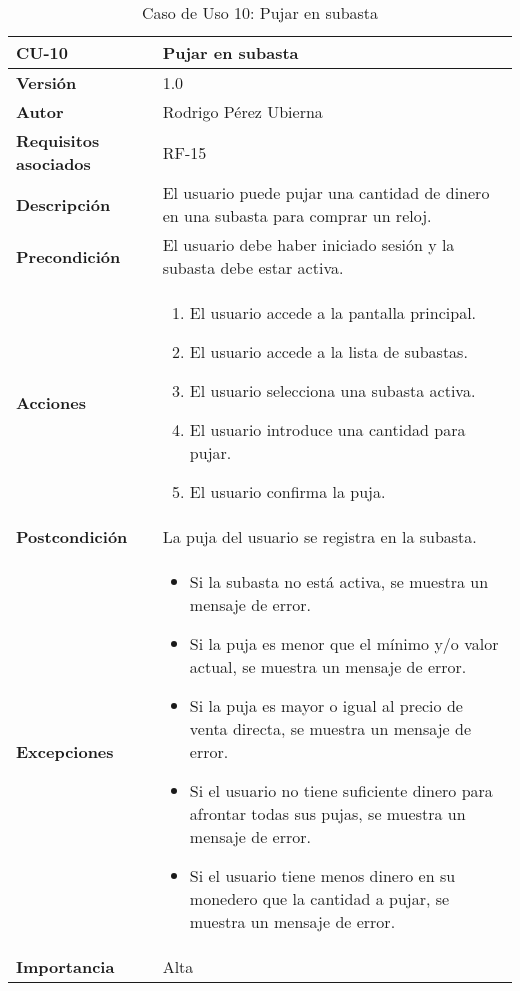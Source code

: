 \begin{table}[p]
	\centering
	\begin{tabularx}{\linewidth}{ p{} p{} }
		\toprule
		\textbf{CU-10} & \textbf{Pujar en subasta}\\
		\toprule
		\textbf{Versión} & 1.0 \\
		\textbf{Autor} & Rodrigo Pérez Ubierna \\
		\textbf{Requisitos asociados} & RF-15 \\
		\textbf{Descripción} & El usuario puede pujar una cantidad de dinero en una subasta para comprar un reloj. \\
		\textbf{Precondición} & El usuario debe haber iniciado sesión y la subasta debe estar activa. \\
		\textbf{Acciones} &
		\begin{enumerate}
			\def\labelenumi{\arabic{enumi}.}
			\tightlist
			\item El usuario accede a la pantalla principal.
			\item El usuario accede a la lista de subastas.
			\item El usuario selecciona una subasta activa.
			\item El usuario introduce una cantidad para pujar.
			\item El usuario confirma la puja.
		\end{enumerate}\\
		\textbf{Postcondición} & La puja del usuario se registra en la subasta. \\
		\textbf{Excepciones} &
			\begin{itemize}
				\item Si la subasta no está activa, se muestra un mensaje de error.
				\item Si la puja es menor que el mínimo y/o valor actual, se muestra un mensaje de error.
				\item Si la puja es mayor o igual al precio de venta directa, se muestra un mensaje de error.
				\item Si el usuario no tiene suficiente dinero para afrontar todas sus pujas, se muestra un mensaje de error.
				\item Si el usuario tiene menos dinero en su monedero que la cantidad a pujar, se muestra un mensaje de error.
			\end{itemize} \\
		\textbf{Importancia} & Alta \\
		\bottomrule
	\end{tabularx}
	\caption{Caso de Uso 10: Pujar en subasta}
\end{table}


